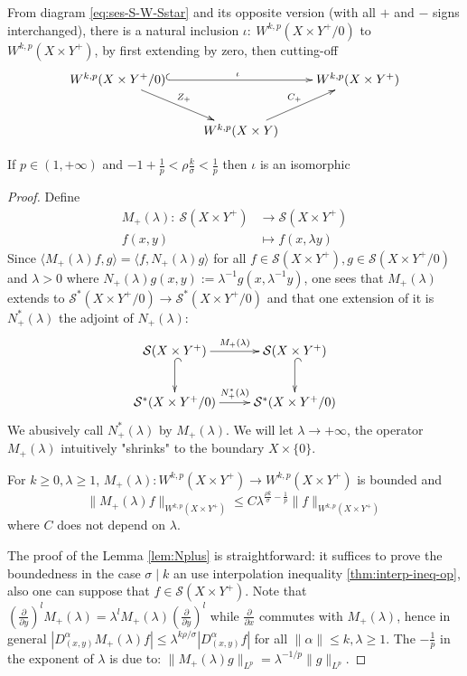 From diagram \eqref{eq:ses-S-W-Sstar} and its opposite version (with all \(+\) and \(-\)
signs interchanged), there is a natural inclusion \(\iota:\ W^{k,p}(X\times
Y^+/0)\) to \(W^{k,p}(X\times Y^+)\), by first extending by zero, then cutting-off
\[
 \xymatrix{
W^{k,p}(X\times Y^+/0) \ar@{^{(}->}[rr]^{\iota} \ar@{->}[rd]^{Z_+} &  & W^{k,p}(X\times Y^+) \\
 & W^{k,p}(X\times Y) \ar@{->}[ru]^{C_+} & 
}
\]

\begin{theorem}
\label{thm:vanishing-trace}
If \(p\in (1,+\infty)\) and \(-1+ \frac{1}{p} < \rho \frac{k}{\sigma} < \frac{1}{p}\)
then \(\iota\) is an isomorphic
\end{theorem}



\begin{proof}
Define
\begin{align*}
  M_+(\lambda):\ \mathcal{S}(X\times Y^+) &\longrightarrow \mathcal{S}(X\times Y^+) \\
  		 f(x,y) &\longmapsto f(x, \lambda y)
\end{align*}
Since \(\langle M_+(\lambda)f, g \rangle = \langle f , N_+(\lambda) g \rangle\) for all
\(f\in \mathcal{S}(X\times Y^+), g\in \mathcal{S}(X\times Y^+/0)\) and \(\lambda >0\) where \(N_+(\lambda)g(x,y):=
\lambda^{-1}g(x, \lambda^{-1}y)\), one sees that \(M_+(\lambda)\) extends to \(\mathcal{S}^*(X\times Y^+/0) \longrightarrow \mathcal{S}^*(X\times Y^+/0)\) and that one
extension of it is \(N^*_+(\lambda)\) the adjoint of \(N_+(\lambda)\):
\[
 \xymatrix{
\mathcal{S}(X\times Y^+) \ar@{^{(}->}[d] \ar@{->}[r]^{M_+(\lambda)} & \mathcal{S}(X\times Y^+) \ar@{^{(}->}[d] \\
\mathcal{S}^*(X\times Y^+/0) \ar@{->}[r]^{N_+^*(\lambda)} & \mathcal{S}^*(X\times Y^+/0)
}
\]
We abusively call \(N_+^*(\lambda)\) by \(M_+(\lambda)\). We will let \(\lambda \to
+\infty\), the operator \(M_+(\lambda)\) intuitively "shrinks" to the boundary \(X\times \{0\}\).

\begin{lemma}
\label{lem:Nplus}
For \(k\geq 0, \lambda \geq 1\), \(M_+(\lambda): W^{k,p}(X\times Y^+) \longrightarrow
W^{k,p}(X\times Y^+)\) is bounded and
\[
\| M_+(\lambda) f\|_{W^{k,p}(X\times Y^+)} \leq C \lambda^{\frac{\rho
k}{\sigma}-\frac{1}{p} } \|f\|_{W^{k,p}(X\times Y^+)}
\]
where \(C\) does not depend on \(\lambda\).
\end{lemma}

The proof of the Lemma \ref{lem:Nplus} is straightforward: it suffices to prove the
boundedness in the case \(\sigma \mid k\) an use interpolation inequality
\ref{thm:interp-ineq-op}, also one can suppose that \(f\in \mathcal{S}(X\times Y^+)\). Note that \((\frac{\partial}{\partial y})^l M_+(\lambda) =\lambda^l
M_+(\lambda)(\frac{\partial}{\partial y})^l\) while
\(\frac{\partial}{\partial x}\) commutes with \(M_+(\lambda)\), hence in general \(|D_{(x,y)}^\alpha M_+(\lambda) f| \leq
\lambda^{k\rho/\sigma}|D^\alpha_{(x,y)} f|\) for all \(\|\alpha\|\leq k, \lambda \geq 1\). The \(-\frac{1}{p}\) in the exponent of \(\lambda\) is due to: \(\|M_+(\lambda)g\|_{L^p} =\lambda^{-1/p} \| g\|_{L^p}\).


\end{proof}
